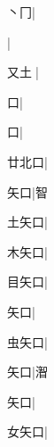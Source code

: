 \begin{multicols}{2}
{{丶冂}|{}\par
{}\mktsJzrVerticalBar{}{\cjk{}{\cnsym{}　}{\cnsym{}　}{\cnsym{}　}}|{}\par
{\cjk{}又土{\cnjzr{}}}|{}\par
{\cjk{}{\cnsym{}　}{\cnsym{}　}口}\mktsJzrVerticalBar{}{\cjk{}{\cnsym{}　}{\cnsym{}　}{\cnsym{}　}}|{}\par
{\cjk{}{\cnsym{}　}{\cnsym{}　}口}\mktsJzrVerticalBar{}{\cjk{}{\cnsym{}　}{\cnsym{}　}{\cnsym{}　}}|{}\par
{\cjk{}廿北口}\mktsJzrVerticalBar{}{\cjk{}{\cnsym{}　}{\cnsym{}　}{\cnsym{}　}}|{}\par
{\cjk{}{\cnsym{}　}矢口}\mktsJzrVerticalBar{}{\cjk{}{\cnsym{}　}{\cnsym{}　}{\cnsym{}　}}|{\cjk{}智}\par
{\cjk{}土矢口}\mktsJzrVerticalBar{}{\cjk{}{\cnsym{}　}{\cnsym{}　}{\cnsym{}　}}|{}\par
{\cjk{}木矢口}\mktsJzrVerticalBar{}{\cjk{}{\cnsym{}　}{\cnsym{}　}{\cnsym{}　}}|{}\par
{\cjk{}目矢口}\mktsJzrVerticalBar{}{\cjk{}{\cnsym{}　}{\cnsym{}　}{\cnsym{}　}}|{}\par
{矢口}\mktsJzrVerticalBar{}{\cjk{}{\cnsym{}　}{\cnsym{}　}{\cnsym{}　}}|{}\par
{\cjk{}虫矢口}\mktsJzrVerticalBar{}{\cjk{}{\cnsym{}　}{\cnsym{}　}{\cnsym{}　}}|{}\par
{矢口}\mktsJzrVerticalBar{}{\cjk{}{\cnsym{}　}{\cnsym{}　}{\cnsym{}　}}|{\cjk{}潪}\par
{矢口}\mktsJzrVerticalBar{}{\cjk{}{\cnsym{}　}{\cnsym{}　}{\cnsym{}　}}|{}\par
{\cjk{}女矢口}\mktsJzrVerticalBar{}{\cjk{}{\cnsym{}　}{\cnsym{}　}{\cnsym{}　}}|{}\par
}
\end{multicols}
